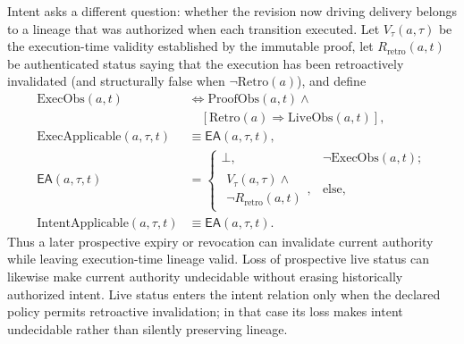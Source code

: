Intent asks a different question: whether the revision now driving delivery
belongs to a lineage that was authorized when each transition executed. Let
$V_{\tau}(a,\tau)$ be the execution-time validity established by the immutable
proof, let $R_{\mathrm{retro}}(a,t)$ be authenticated status saying that the
execution has been retroactively invalidated (and structurally false when
$\neg\mathrm{Retro}(a)$), and define
\[
\begin{aligned}
\mathrm{ExecObs}(a,t)&\Longleftrightarrow \mathrm{ProofObs}(a,t)\land\\
&\quad[\mathrm{Retro}(a)\Rightarrow\mathrm{LiveObs}(a,t)],\\
\mathrm{ExecApplicable}(a,\tau,t)&\equiv \mathsf{EA}(a,\tau,t),\\
\mathsf{EA}(a,\tau,t)&=
\begin{cases}
\bot,&\neg\mathrm{ExecObs}(a,t);\\
\begin{gathered}V_{\tau}(a,\tau)\land\\[-2pt]
\neg R_{\mathrm{retro}}(a,t)\end{gathered},&\text{else},
\end{cases}\\
\mathrm{IntentApplicable}(a,\tau,t)&\equiv
\mathsf{EA}(a,\tau,t).
\end{aligned}
\]
Thus a later prospective expiry or revocation can invalidate current
authority while leaving execution-time lineage valid.
Loss of prospective live status can likewise make current authority
undecidable without erasing historically authorized intent. Live status
enters the intent relation only when the declared policy permits retroactive
invalidation; in that case its loss makes intent undecidable rather than
silently preserving lineage.

